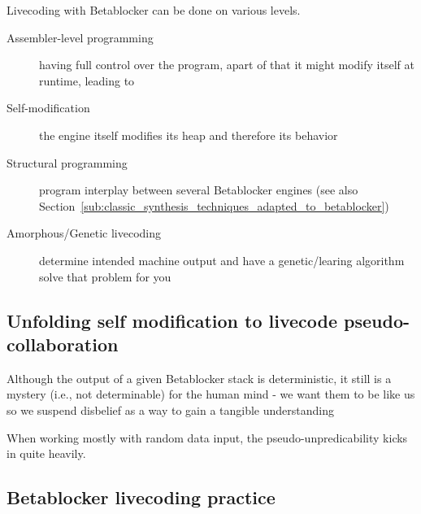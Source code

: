 \documentclass[letterpaper, 12pt]{article}
\begin{document}

Livecoding with Betablocker can be done on various levels.
\begin{description}
	\item[Assembler-level programming] having full control over the program, apart of that it might modify itself at runtime, leading to
	\item[Self-modification] the engine itself modifies its heap and therefore its behavior
	\item[Structural programming] program interplay between several Betablocker engines (see also Section~\ref{sub:classic_synthesis_techniques_adapted_to_betablocker})
	\item[Amorphous/Genetic livecoding] determine intended machine output and have a genetic/learing algorithm solve that problem for you
\end{description}


\subsection{Unfolding self modification to livecode pseudo-collaboration} 
\label{sec:unfolding_self_modification_to_livecode_collaboration}

Although the output of a given Betablocker stack is deterministic, it still is a mystery (i.e., not determinable) for the human mind - we want them to be like us so we suspend disbelief as a way to gain a tangible understanding

When working mostly with random data input, the pseudo-unpredicability kicks in quite heavily. 


\subsection{Betablocker livecoding practice}
\label{sub:livecoding_performance_practice_influenced_by_betablocker}

% 
% 
\end{document}
